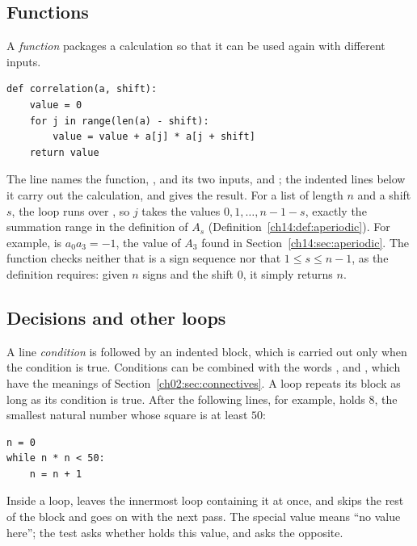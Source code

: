 \subsection*{Functions}
A \emph{function} packages a calculation so that it can be used again with different inputs.
\par\noindent\begin{minipage}{\linewidth}
\begin{lstlisting}
def correlation(a, shift):
    value = 0
    for j in range(len(a) - shift):
        value = value + a[j] * a[j + shift]
    return value
\end{lstlisting}
\end{minipage}\par
The  line names the function, , and its two inputs,  and ; the indented lines below it carry out the calculation, and  gives the result. For a list of length $n$ and a shift $s$, the loop runs over , so $j$ takes the values $0,1,\ldots,n-1-s$, exactly the summation range in the definition of $A_s$ (Definition~\ref{ch14:def:aperiodic}). For example,  is $a_0a_3=-1$, the value of $A_3$ found in Section~\ref{ch14:sec:aperiodic}. The function checks neither that  is a sign sequence nor that $1\le s\le n-1$, as the definition requires: given $n$ signs and the shift $0$, it simply returns $n$.

\subsection*{Decisions and other loops}
A line  \emph{condition}\code{:} is followed by an indented block, which is carried out only when the condition is true. Conditions can be combined with the words ,  and , which have the meanings of Section~\ref{ch02:sec:connectives}. A  loop repeats its block as long as its condition is true. After the following lines, for example,  holds $8$, the smallest natural number whose square is at least $50$:
\par\noindent\begin{minipage}{\linewidth}
\begin{lstlisting}
n = 0
while n * n < 50:
    n = n + 1
\end{lstlisting}
\end{minipage}\par
Inside a loop,  leaves the innermost loop containing it at once, and  skips the rest of the block and goes on with the next pass. The special value  means ``no value here''; the test  asks whether  holds this value, and  asks the opposite.

